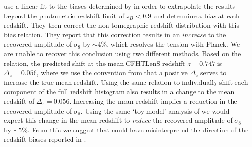 \cite{kitching/etal:2016} use a linear fit to the biases determined by \citet{choi/etal:2016} in order to extrapolate the results beyond the photometric redshift limit of $z_B<0.9$ and determine a bias at each redshift.  They then correct the non-tomographic \citet{kilbinger/etal:2013} redshift distribution with this bias relation.  They report that this correction results in an {\it increase} to the recovered amplitude of $\sigma_8$ by $\sim 4$\%, which resolves the tension with Planck.   We are unable to recover this conclusion using two different methods.   Based on the \cite{kitching/etal:2016} relation, the predicted shift at the mean CFHTLenS redshift $z=0.747$ is $\Delta_z = 0.056$, where we use the convention from \citet{choi/etal:2016} that a positive $\Delta_z$ serves to increase the true mean redshift.  Using the same relation to individually shift each component of the full \citet{kilbinger/etal:2013} redshift histogram also results in a change to the mean redshift of $\Delta_z = 0.056$.  Increasing the mean redshift implies a reduction in the recovered amplitude of $\sigma_8$.  Using the same `toy-model' analysis of \citet{choi/etal:2016} we would expect this change in the mean redshift to {\it reduce} the recovered amplitude of $\sigma_8$ by $\sim 5$\%.    From this we suggest that \cite{kitching/etal:2016} could have misinterpreted the direction of the redshift biases reported in \citet{choi/etal:2016}. 



 